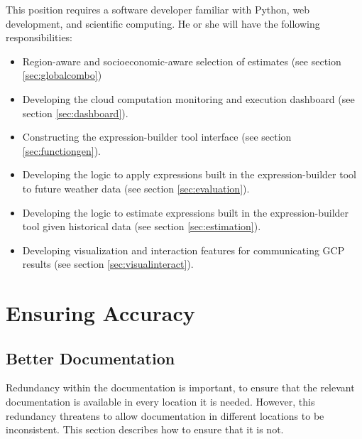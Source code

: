\documentclass[12pt, oneside]{amsart}
\begin{document}
This position requires a software developer familiar with Python, web development, and scientific computing.  He or she will have the following responsibilities:

\begin{itemize}
\item Region-aware and socioeconomic-aware selection of estimates (see section \ref{sec:globalcombo})
\item Developing the cloud computation monitoring and execution dashboard (see section \ref{sec:dashboard}).
\item Constructing the expression-builder tool interface (see section \ref{sec:functiongen}).
\item Developing the logic to apply expressions built in the expression-builder tool to future weather data (see section \ref{sec:evaluation}).
\item Developing the logic to estimate expressions built in the expression-builder tool given historical data (see section \ref{sec:estimation}).
\item Developing visualization and interaction features for communicating GCP results (see section \ref{sec:visualinteract}).
\end{itemize}

\section{Ensuring Accuracy}

\subsection{Better Documentation}
\label{sec:betterdocs}

Redundancy within the documentation is important, to ensure that the relevant documentation is available in every location it is needed.  However, this redundancy threatens to allow documentation in different locations to be inconsistent.  This section describes how to ensure that it is not.
\end{document}
